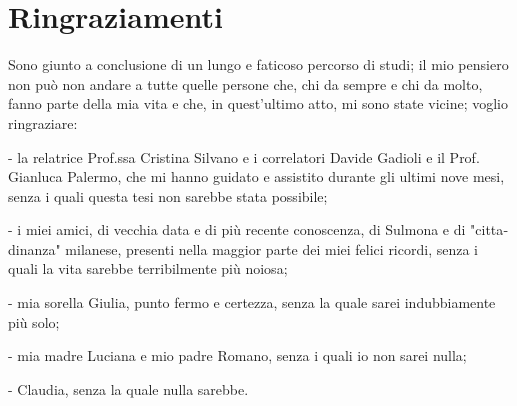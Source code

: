 \chapter*{Ringraziamenti}

\begin{otherlanguage}{italian}





Sono giunto a conclusione di un lungo e faticoso percorso di studi; il mio pensiero non può non andare a tutte quelle persone che, chi da sempre e chi da molto, fanno parte della mia vita e che, in quest'ultimo atto, mi sono state vicine; voglio ringraziare:





- la relatrice Prof.ssa Cristina Silvano e i correlatori Davide Gadioli e il Prof. Gianluca Palermo, che mi hanno guidato e assistito durante gli ultimi nove mesi, senza i quali questa tesi non sarebbe stata possibile;





- i miei amici, di vecchia data e di più recente conoscenza, di Sulmona e di "cittadinanza" milanese, presenti nella maggior parte dei miei felici ricordi, senza i quali la vita sarebbe terribilmente più noiosa;





- mia sorella Giulia, punto fermo e certezza, senza la quale sarei indubbiamente più solo;





- mia madre Luciana e mio padre Romano, senza i quali io non sarei nulla;





- Claudia, senza la quale nulla sarebbe.





\end{otherlanguage}
